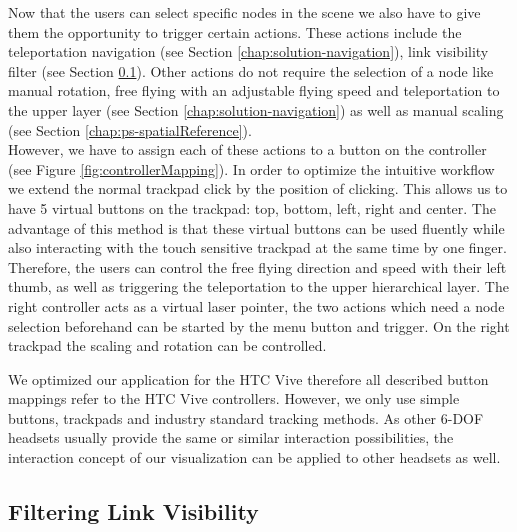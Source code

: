 Now that the users can select specific nodes in the scene we also have to give them the opportunity to trigger certain actions. These actions include the teleportation navigation (see Section \ref{chap:solution-navigation}), link visibility filter (see Section \ref{chap:ps-filterLinks}). 
Other actions do not require the selection of a node like manual rotation, free flying with an adjustable flying speed and teleportation to the upper layer (see Section \ref{chap:solution-navigation}) as well as manual scaling (see Section \ref{chap:ps-spatialReference}).\\
However, we have to assign each of these actions to a button on the controller (see Figure \ref{fig:controllerMapping}). In order to optimize the intuitive workflow we extend the normal trackpad click by the position of clicking. 
This allows us to have 5 virtual buttons on the trackpad: top, bottom, left, right and center. The advantage of this method is that these virtual buttons can be used fluently while also interacting with the touch sensitive trackpad at the same time by one finger. 
Therefore, the users can control the free flying direction and speed with their left thumb, as well as triggering the teleportation to the upper hierarchical layer. The right controller acts as a virtual laser pointer, the two actions which need a node selection beforehand can be started by the menu button and trigger. 
On the right trackpad the scaling and rotation can be controlled.

We optimized our application for the HTC Vive therefore all described button mappings refer to the HTC Vive controllers. However, we only use simple buttons, trackpads and industry standard tracking methods. 
As other 6-DOF headsets usually provide the same or similar interaction possibilities, the interaction concept of our visualization can be applied to other headsets as well.\\

\subsection{Filtering Link Visibility}
\label{chap:ps-filterLinks}

